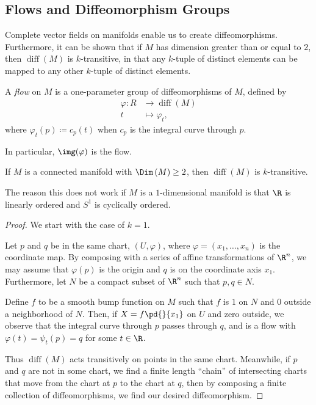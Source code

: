 \documentclass[10pt]{mypackage}
\begin{document}
\subsection{Flows and Diffeomorphism Groups}%
Complete vector fields on manifolds enable us to create diffeomorphisms. Furthermore, it can be shown that if $M$ has dimension greater than or equal to $2$, then $\operatorname{diff}\left( M \right)$ is $k$-transitive, in that any $k$-tuple of distinct elements can be mapped to any other $k$-tuple of distinct elements.
\begin{definition}
  A \textit{flow} on $M$ is a one-parameter group of diffeomorphisms of $M$, defined by
  \begin{align*}
    \varphi\colon R &\rightarrow \operatorname{diff}\left( M \right)\\
    t &\mapsto \varphi_t,
  \end{align*}
  where $\varphi_t(p) \coloneq c_p(t)$ when $c_p$ is the integral curve through $p$.\newline

  In particular, $\img(\varphi)$ is the flow.
\end{definition}
\begin{proposition}
  If $M$ is a connected manifold with $\Dim\left( M \right) \geq 2$, then $\operatorname{diff}\left( M \right)$ is $k$-transitive.
\end{proposition}
\begin{remark}
  The reason this does not work if $M$ is a $1$-dimensional manifold is that $\R$ is linearly ordered and $S^{1}$ is cyclically ordered.
\end{remark}
\begin{proof}
  We start with the case of $k = 1$.\newline

  Let $p$ and $q$ be in the same chart, $\left( U,\varphi \right)$, where $\varphi = \left( x_1,\dots,x_n \right)$ is the coordinate map. By composing with a series of affine transformations of $\R^{n}$, we may assume that $\varphi(p)$ is the origin and $q$ is on the coordinate axis $x_1$. Furthermore, let $N$ be a compact subset of $\R^{n}$ such that $p,q\in N$.\newline

  Define $f$ to be a smooth bump function on $M$ such that $f$ is $1$ on $N$ and $0$ outside a neighborhood of $N$. Then, if $X = f \pd{}{x_1}$ on $U$ and zero outside, we observe that the integral curve through $p$ passes through $q$, and is a flow with $\varphi(t) = \psi_t(p) = q$ for some $t\in \R$.\newline

  Thus $\operatorname{diff}\left( M \right)$ acts transitively on points in the same chart. Meanwhile, if $p$ and $q$ are not in some chart, we find a finite length ``chain'' of intersecting charts that move from the chart at $p$ to the chart at $q$, then by composing a finite collection of diffeomorphisms, we find our desired diffeomorphism.
\end{proof}
\end{document}
